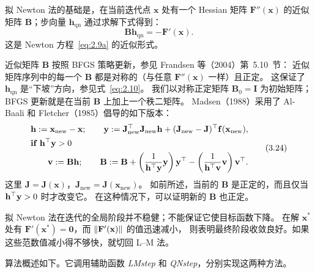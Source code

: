 拟 Newton 法的基础是，在当前迭代点 $\mathbf{x}$ 处有一个 Hessian 矩阵
$\mathbf{F}''(\mathbf{x})$ 的近似矩阵 $\mathbf{B}$；步向量 $\mathbf{h}_{\mathrm{qn}}$ 通过求解下式得到：
\begin{equation}
  \mathbf{B}\mathbf{h}_{\mathrm{qn}}=-\mathbf{F}'(\mathbf{x}).
  \tag{3.23}\label{eq:3.23}
\end{equation}
这是 Newton 方程~\eqref{eq:2.9a} 的近似形式。

近似矩阵 $\mathbf{B}$ 按照 BFGS 策略更新，参见 Frandsen 等（2004）第~5.10~节：
近似矩阵序列中的每一个 $\mathbf{B}$ 都是对称的（与任意 $\mathbf{F}''(\mathbf{x})$ 一样）且正定。
这保证了 $\mathbf{h}_{\mathrm{qn}}$ 是“下坡”方向，参见式~\eqref{eq:2.10}。
我们以对称正定矩阵 $\mathbf{B}_0=\mathbf{I}$ 为初始矩阵；BFGS 更新就是在当前 $\mathbf{B}$ 上加上一个秩二矩阵。
Madsen（1988）采用了 Al-Baali 和 Fletcher（1985）倡导的如下版本：
\begin{equation}
\begin{aligned}
  &\mathbf{h}:=\mathbf{x}_{\mathrm{new}}-\mathbf{x};\qquad
   \mathbf{y}:=\mathbf{J}_{\mathrm{new}}^{\top}\mathbf{J}_{\mathrm{new}}\mathbf{h}
        +(\mathbf{J}_{\mathrm{new}}-\mathbf{J})^{\top}\mathbf{f}(\mathbf{x}_{\mathrm{new}}),\\
  &\textbf{if }\mathbf{h}^{\top}\mathbf{y}>0\\
  &\qquad \mathbf{v}:=\mathbf{B}\mathbf{h};\qquad
    \mathbf{B}:=\mathbf{B}+\left(\frac{1}{\mathbf{h}^{\top}\mathbf{y}}\mathbf{y}\right)\mathbf{y}^{\top}
        -\left(\frac{1}{\mathbf{h}^{\top}\mathbf{v}}\mathbf{v}\right)\mathbf{v}^{\top}.
\end{aligned}
\tag{3.24}\label{eq:3.24}
\end{equation}
这里 $\mathbf{J}=\mathbf{J}(\mathbf{x})$，$\mathbf{J}_{\mathrm{new}}=\mathbf{J}(\mathbf{x}_{\mathrm{new}})$。
如前所述，当前的 $\mathbf{B}$ 是正定的，而且仅当 $\mathbf{h}^{\top}\mathbf{y}>0$ 时才改变它。
在这种情况下，可以证明新的 $\mathbf{B}$ 也正定。

拟 Newton 法在迭代的全局阶段并不稳健；不能保证它使目标函数下降。
在解 $\mathbf{x}^*$ 处有 $\mathbf{F}'(\mathbf{x}^*)=\mathbf{0}$，而 $\lVert\mathbf{F}'(\mathbf{x})\rVert$ 的值迅速减小，
则表明最终阶段收敛良好。如果这些范数值减小得不够快，就切回 L--M 法。

算法概述如下。它调用辅助函数 \textit{LMstep} 和 \textit{QNstep}，分别实现这两种方法。

